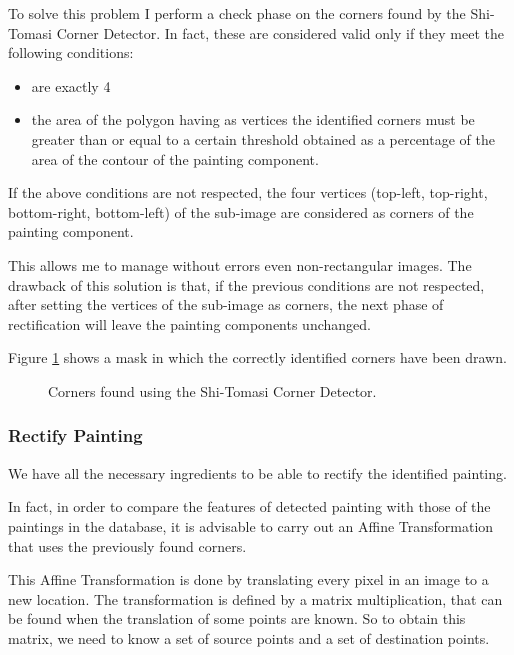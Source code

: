 \documentclass[10pt,twocolumn,letterpaper]{article}
\begin{document}
To solve this problem I perform a check phase on the corners found by the Shi-Tomasi Corner Detector. In fact, these are considered valid only if they meet the following conditions:
\begin{itemize}
   \item are exactly 4
   \item the area of ​​the polygon having as vertices the identified corners must be greater than or equal to a certain threshold obtained as a percentage of the area of ​​the contour of the painting component.
\end{itemize}

If the above conditions are not respected, the four vertices (top-left, top-right, bottom-right, bottom-left) of the sub-image are considered as corners of the painting component.

This allows me to manage without errors even non-rectangular images. The drawback of this solution is that, if the previous conditions are not respected, after setting the vertices of the sub-image as corners, the next phase of rectification will leave the painting components unchanged.

Figure \ref{fig:cornersDetect} shows a mask in which the correctly identified corners have been drawn.

\begin{figure}[t]
   \begin{center}
   \fbox{\rule{0pt}{2in} \rule{0.9\linewidth}{0pt}}
   \end{center}
      \caption{Corners found using the Shi-Tomasi Corner Detector.}
   \label{fig:cornersDetect}
\end{figure}

\subsubsection{Rectify Painting}

We have all the necessary ingredients to be able to rectify the identified painting.

In fact, in order to compare the features of detected painting with those of the paintings in the database, it is advisable to carry out an Affine Transformation that uses the previously found corners.

This Affine Transformation is done by translating every pixel in an image to a new location. The transformation is defined by a matrix multiplication, that can be found when the translation of some points are known. So to obtain this matrix, we need to know a set of source points and a set of destination points.
\end{document}
